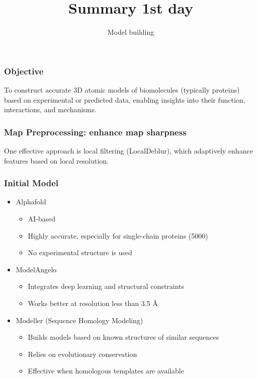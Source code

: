 \documentclass{beamer}
\title{Summary 1st day}
\subtitle{Model building}
\date{}
\begin{document}
\frame{\titlepage}

\begin{frame}
\LARGE
\frametitle{Objective}

To construct accurate 3D atomic models of biomolecules (typically proteins) based on experimental or predicted data, enabling insights into their function, interactions, and mechanisms.

\end{frame}


\begin{frame}
\LARGE
\frametitle{Map Preprocessing:  enhance map sharpness}

One effective approach is local filtering (LocalDeblur), which adaptively enhance features based on local resolution.

\end{frame}

\begin{frame}
\LARGE
\frametitle{Initial Model}
\begin{itemize}
 \item Alphafold
    \begin{itemize}
    \item AI-based
    \item Highly accurate, especially for single-chain proteins (5000)
    \item No experimental structure is used
    \end{itemize}
 \item ModelAngelo
    \begin{itemize}
    \item Integrates deep learning and structural constraints
    \item Works better at resolution less than 3.5 \AA
    \end{itemize}
 \item  Modeller (Sequence Homology Modeling)
    \begin{itemize}
    \item Builds models based on known structures of similar sequences
    \item Relies on evolutionary conservation
    \item Effective when homologous templates are available
    \end{itemize}
\end{itemize}
\end{frame}
\end{document}
